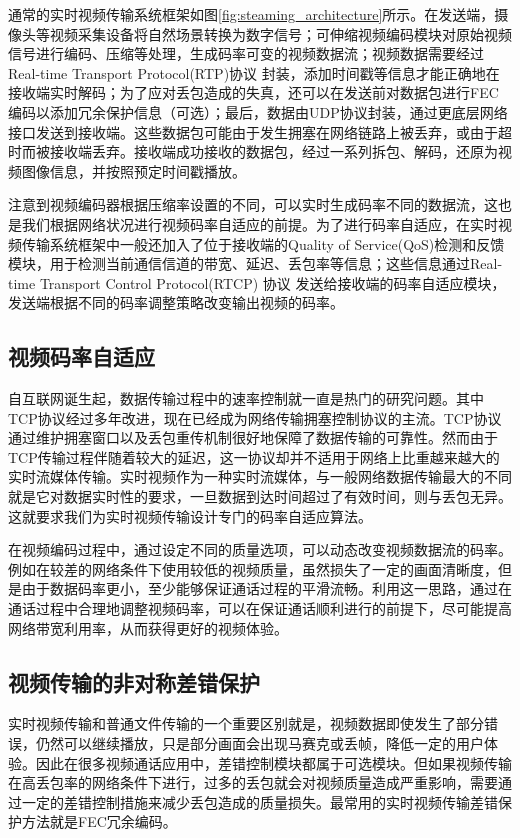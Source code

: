 通常的实时视频传输系统框架如图\ref{fig:steaming_architecture}\cite{wu2000transporting}所示。在发送端，摄像头等视频采集设备将自然场景转换为数字信号；可伸缩视频编码模块对原始视频信号进行编码、压缩等处理，生成码率可变的视频数据流；视频数据需要经过Real-time Transport Protocol(RTP)协议 \cite{jacobson2003rtp} 封装，添加时间戳等信息才能正确地在接收端实时解码；为了应对丢包造成的失真，还可以在发送前对数据包进行FEC编码以添加冗余保护信息（可选）；最后，数据由UDP协议封装，通过更底层网络接口发送到接收端。这些数据包可能由于发生拥塞在网络链路上被丢弃，或由于超时而被接收端丢弃。接收端成功接收的数据包，经过一系列拆包、解码，还原为视频图像信息，并按照预定时间戳播放。

注意到视频编码器根据压缩率设置的不同，可以实时生成码率不同的数据流，这也是我们根据网络状况进行视频码率自适应的前提。为了进行码率自适应，在实时视频传输系统框架中一般还加入了位于接收端的Quality of Service(QoS)检测和反馈模块，用于检测当前通信信道的带宽、延迟、丢包率等信息；这些信息通过Real-time Transport Control Protocol(RTCP) 协议 \cite{jacobson2003rtp} 发送给接收端的码率自适应模块，发送端根据不同的码率调整策略改变输出视频的码率。


\subsection{视频码率自适应}
自互联网诞生起，数据传输过程中的速率控制就一直是热门的研究问题。其中TCP协议经过多年改进，现在已经成为网络传输拥塞控制协议的主流。TCP协议通过维护拥塞窗口以及丢包重传机制很好地保障了数据传输的可靠性。然而由于TCP传输过程伴随着较大的延迟，这一协议却并不适用于网络上比重越来越大的实时流媒体传输。实时视频作为一种实时流媒体，与一般网络数据传输最大的不同就是它对数据实时性的要求，一旦数据到达时间超过了有效时间，则与丢包无异。这就要求我们为实时视频传输设计专门的码率自适应算法。

在视频编码过程中，通过设定不同的质量选项，可以动态改变视频数据流的码率。例如在较差的网络条件下使用较低的视频质量，虽然损失了一定的画面清晰度，但是由于数据码率更小，至少能够保证通话过程的平滑流畅。利用这一思路，通过在通话过程中合理地调整视频码率，可以在保证通话顺利进行的前提下，尽可能提高网络带宽利用率，从而获得更好的视频体验。

\subsection{视频传输的非对称差错保护}
实时视频传输和普通文件传输的一个重要区别就是，视频数据即使发生了部分错误，仍然可以继续播放，只是部分画面会出现马赛克或丢帧，降低一定的用户体验。因此在很多视频通话应用中，差错控制模块都属于可选模块。但如果视频传输在高丢包率的网络条件下进行，过多的丢包就会对视频质量造成严重影响，需要通过一定的差错控制措施来减少丢包造成的质量损失。最常用的实时视频传输差错保护方法就是FEC冗余编码。

